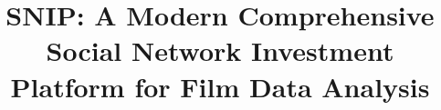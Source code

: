 \documentclass[sigconf]{acmart}
\begin{document}
\title[SNIP: A Modern Comprehensive Social Network Investment Platform ]{SNIP: A Modern Comprehensive Social Network Investment Platform for Film Data Analysis }

\maketitle















\end{document}
